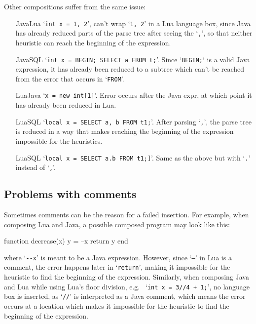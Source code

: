 \documentclass[sigplan,screen]{acmart}\settopmatter{printfolios=true,printccs=false,printacmref=false}
\begin{document}
Other compositions suffer from the same issue:
\begin{itemize}
    \item[JavaLua] `\verb|int x = 1, 2|', can't wrap `\verb|1, 2|' in a Lua
        language box, since Java has already reduced parts of the parse tree
        after seeing the `\texttt{,}', so that neither heuristic can reach the
        beginning of the expression.
    \item[JavaSQL] `\verb|int x = BEGIN; SELECT a FROM t;|'. Since `\texttt{BEGIN;}` is a
        valid Java expression, it has already been reduced to a subtree which
        can't be reached from the error that occurs in `\texttt{FROM}'.
    \item[LuaJava] `\verb|x = new int[1]|'. Error occurs after the Java expr, at
        which point it has already been reduced in Lua.
    \item[LuaSQL] `\verb|local x = SELECT a, b FROM t1;|'. After parsing
        `\texttt{,}', the parse tree is reduced in a way that makes reaching the
        beginning of the expression impossible for the heuristics.
    \item[LuaSQL] `\verb|local x = SELECT a.b FROM t1;]|'. Same as the above but
        with `\texttt{.}' instead of `\texttt{,}'.
\end{itemize}

\subsection{Problems with comments}

Sometimes comments can be the reason for a failed insertion. For example, when
composing Lua and Java, a possible composed program may look like this:

\begin{lstdefault}[language={[5.2]Lua}]
function decrease(x)
    y = --x
    return y
end
\end{lstdefault}

where `\verb|--x|' is meant to be a Java expression. However, since `\texttt{--}'
in Lua is a comment, the error happens later in `\texttt{return}', making it
impossible for the heuristic to find the beginning of the expression.
Similarly, when composing Java and Lua while using Lua's floor division, e.g.~
`\verb|int x = 3//4 + 1;|', no language box is inserted, as `\texttt{//}' is interpreted
as a Java comment, which means the error occurs at a location which makes it impossible
for the heuristic to find the beginning of the expression.
\end{document}
